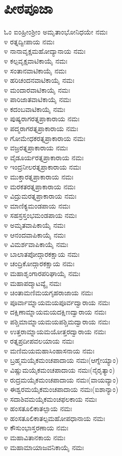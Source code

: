 \section{ಪೀಠಪೂಜಾ}ಓಂ ಐಂಹ್ರೀಂಶ್ರೀಂ ಅಮೃತಾಂಭೋನಿಧಯೇ ನಮಃ\\೪ ರತ್ನದ್ವೀಪಾಯ ನಮಃ\\೪ ನಾನಾವೃಕ್ಷಮಹೋದ್ಯಾನಾಯ ನಮಃ\\೪ ಕಲ್ಪವೃಕ್ಷವಾಟಿಕಾಯೈ ನಮಃ\\೪ ಸಂತಾನವಾಟಿಕಾಯೈ ನಮಃ\\೪ ಹರಿಚಂದನವಾಟಿಕಾಯೈ ನಮಃ\\೪ ಮಂದಾರವಾಟಿಕಾಯೈ ನಮಃ\\೪ ಪಾರಿಜಾತವಾಟಿಕಾಯೈ ನಮಃ\\೪ ಕದಂಬವಾಟಿಕಾಯೈ ನಮಃ\\೪ ಪುಷ್ಯರಾಗರತ್ನಪ್ರಾಕಾರಾಯ ನಮಃ\\೪ ಪದ್ಮರಾಗರತ್ನಪ್ರಾಕಾರಾಯ ನಮಃ\\೪ ಗೋಮೇಧಕರತ್ನಪ್ರಾಕಾರಾಯ ನಮಃ\\೪ ವಜ್ರರತ್ನಪ್ರಾಕಾರಾಯ ನಮಃ\\೪ ವೈಡೂರ್ಯರತ್ನಪ್ರಾಕಾರಾಯ ನಮಃ\\೪ ಇಂದ್ರನೀಲರತ್ನಪ್ರಾಕಾರಾಯ ನಮಃ\\೪ ಮುಕ್ತಾರತ್ನಪ್ರಾಕಾರಾಯ ನಮಃ\\೪ ಮರಕತರತ್ನಪ್ರಾಕಾರಾಯ ನಮಃ\\೪ ವಿದ್ರುಮರತ್ನಪ್ರಾಕಾರಾಯ ನಮಃ\\೪ ಮಾಣಿಕ್ಯಮಂಡಪಾಯ ನಮಃ\\೪ ಸಹಸ್ರಸ್ತಂಭಮಂಡಪಾಯ ನಮಃ\\೪ ಅಮೃತವಾಪಿಕಾಯೈ ನಮಃ\\೪ ಆನಂದವಾಪಿಕಾಯೈ ನಮಃ\\೪ ವಿಮರ್ಶವಾಪಿಕಾಯೈ ನಮಃ\\೪ ಬಾಲಾತಪೋದ್ಗಾರಕಕ್ಷಾಯ ನಮಃ\\೪ ಚಂದ್ರಿಕೋದ್ಗಾರಕಕ್ಷಾಯ ನಮಃ\\೪ ಮಹಾಶೃಂಗಾರಪರಿಘಾಯೈ ನಮಃ\\೪ ಮಹಾಪದ್ಮಾಟವ್ಯೈ ನಮಃ\\೪ ಚಿಂತಾಮಣಿಮಯಗೃಹರಾಜಾಯ ನಮಃ\\೪ ಪೂರ್ವಾಮ್ನಾಯಮಯಪೂರ್ವದ್ವಾರಾಯ ನಮಃ\\೪ ದಕ್ಷಿಣಾಮ್ನಾಯಮಯದಕ್ಷಿಣದ್ವಾರಾಯ ನಮಃ\\೪ ಪಶ್ಚಿಮಾಮ್ನಾಯಮಯಪಶ್ಚಿಮದ್ವಾರಾಯ ನಮಃ\\೪ ಉತ್ತರಾಮ್ನಾಯಮಯೋತ್ತರದ್ವಾರಾಯ ನಮಃ\\೪ ರತ್ನಪ್ರದೀಪವಲಯಾಯ ನಮಃ\\೪ ಮಣಿಮಯಮಹಾಸಿಂಹಾಸನಾಯ ನಮಃ\\೪ ಬ್ರಹ್ಮಮಯೈಕಮಂಚಪಾದಾಯ ನಮಃ(ಆಗ್ನೇಯ್ಯಾಂ)\\೪ ವಿಷ್ಣುಮಯೈಕಮಂಚಪಾದಾಯ ನಮಃ(ನೈರೃತ್ಯಾಂ)\\೪ ರುದ್ರಮಯೈಕಮಂಚಪಾದಾಯ ನಮಃ(ವಾಯವ್ಯಾಂ)\\೪ ಈಶ್ವರಮಯೈಕಮಂಚಪಾದಾಯ ನಮಃ(ಐಶಾನ್ಯಾಂ)\\೪ ಸದಾಶಿವಮಯೈಕಮಂಚಫಲಕಾಯ ನಮಃ\\೪ ಹಂಸತೂಲಿಕಾತಲ್ಪಾಯ ನಮಃ\\೪ ಹಂಸತೂಲಿಕಾತಲ್ಪಮಹೋಪಧಾನಾಯ ನಮಃ\\೪ ಕೌಸುಂಭಾಸ್ತರಣಾಯ ನಮಃ\\೪ ಮಹಾವಿತಾನಕಾಯ ನಮಃ\\೪ ಮಹಾಮಾಯಾಜವನಿಕಾಯೈ ನಮಃ
